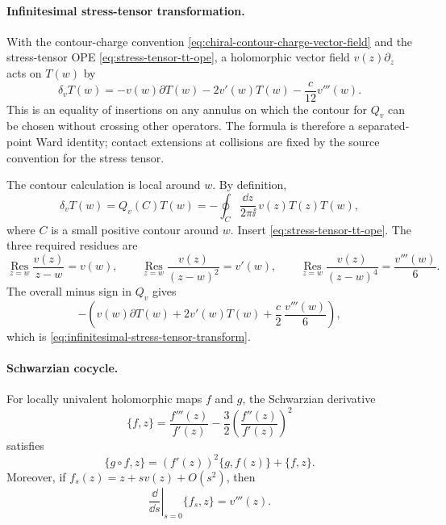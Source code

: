 \paragraph{Infinitesimal stress-tensor transformation.}
With the contour-charge convention
\eqref{eq:chiral-contour-charge-vector-field} and the stress-tensor OPE
\eqref{eq:stress-tensor-tt-ope}, a holomorphic vector field
\(v(z)\partial_z\) acts on \(T(w)\) by
\begin{equation}
  \delta_v T(w)
  =
  -v(w)\partial T(w)-2v'(w)T(w)-\frac{c}{12}v'''(w).
  \label{eq:infinitesimal-stress-tensor-transform}
\end{equation}
This is an equality of insertions on any annulus on which the contour for
\(Q_v\) can be chosen without crossing other operators.  The formula is
therefore a separated-point Ward identity; contact extensions at collisions
are fixed by the source convention for the stress tensor.

The contour calculation is local around \(w\).  By definition,
\[
  \delta_vT(w)=Q_v(C)T(w)
  =
  -\oint_C\frac{\dd z}{2\pi\ii}\,v(z)T(z)T(w),
\]
where \(C\) is a small positive contour around \(w\).  Insert
\eqref{eq:stress-tensor-tt-ope}.  The three required residues are
\[
  \operatorname*{Res}_{z=w}\frac{v(z)}{z-w}=v(w),
  \qquad
  \operatorname*{Res}_{z=w}\frac{v(z)}{(z-w)^2}=v'(w),
  \qquad
  \operatorname*{Res}_{z=w}\frac{v(z)}{(z-w)^4}=\frac{v'''(w)}6 .
\]
The overall minus sign in \(Q_v\) gives
\[
  -\left(
    v(w)\partial T(w)
    +2v'(w)T(w)
    +\frac c2\,\frac{v'''(w)}6
  \right),
\]
which is \eqref{eq:infinitesimal-stress-tensor-transform}.

\paragraph{Schwarzian cocycle.}
For locally univalent holomorphic maps \(f\) and \(g\), the Schwarzian
derivative
\[
  \{f,z\}
  =
  \frac{f'''(z)}{f'(z)}
  -
  \frac32\left(\frac{f''(z)}{f'(z)}\right)^2
\]
satisfies
\begin{equation}
  \{g\circ f,z\}
  =
  (f'(z))^2\{g,f(z)\}+\{f,z\}.
  \label{eq:schwarzian-cocycle}
\end{equation}
Moreover, if \(f_s(z)=z+s v(z)+O(s^2)\), then
\begin{equation}
  \left.\frac{\dd}{\dd s}\right|_{s=0}\{f_s,z\}
  =
  v'''(z).
  \label{eq:schwarzian-linearization}
\end{equation}

